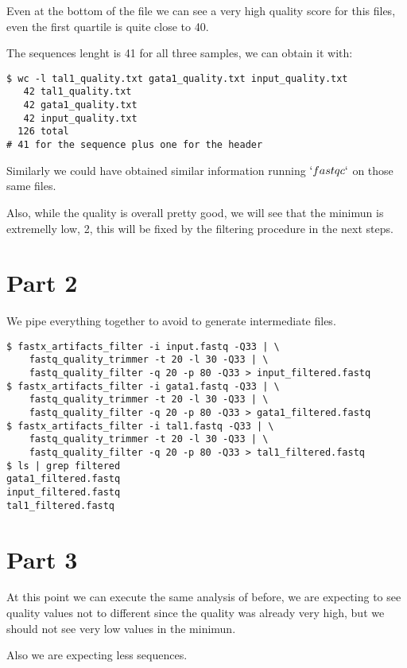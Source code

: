 \documentclass[11pt]{article} %
\begin{document}
Even at the bottom of the file we can see a very high quality score for this files, even the first quartile is quite close to 40.

The sequences lenght is 41 for all three samples, we can obtain it with: 

\begin{lstlisting}
$ wc -l tal1_quality.txt gata1_quality.txt input_quality.txt 
   42 tal1_quality.txt
   42 gata1_quality.txt
   42 input_quality.txt
  126 total
# 41 for the sequence plus one for the header
\end{lstlisting}

Similarly we could have obtained similar information running $`fastqc`$ on those same files.

Also, while the quality is overall pretty good, we will see that the minimun is extremelly low, 2, this will be fixed by the filtering procedure in the next steps.

\section{Part 2}

We pipe everything together to avoid to generate intermediate files.

\begin{lstlisting}
$ fastx_artifacts_filter -i input.fastq -Q33 | \
    fastq_quality_trimmer -t 20 -l 30 -Q33 | \
    fastq_quality_filter -q 20 -p 80 -Q33 > input_filtered.fastq
$ fastx_artifacts_filter -i gata1.fastq -Q33 | \
    fastq_quality_trimmer -t 20 -l 30 -Q33 | \
    fastq_quality_filter -q 20 -p 80 -Q33 > gata1_filtered.fastq
$ fastx_artifacts_filter -i tal1.fastq -Q33 | \
    fastq_quality_trimmer -t 20 -l 30 -Q33 | \
    fastq_quality_filter -q 20 -p 80 -Q33 > tal1_filtered.fastq
$ ls | grep filtered
gata1_filtered.fastq
input_filtered.fastq
tal1_filtered.fastq

\end{lstlisting}

\section{Part 3}

At this point we can execute the same analysis of before, we are expecting to see quality values not to different since the quality was already very high, but we should not see very low values in the minimun.

Also we are expecting less sequences.
\end{document}
